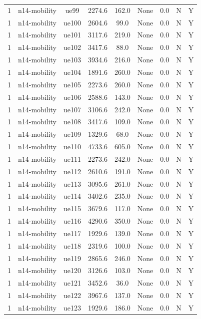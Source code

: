 \begin{table}[ht]
\begin{tabular}{|c|c|c|c|c|c|c|c|c|}
1 & n14-mobility & ue99 & 2274.6 & 162.0 & None & 0.0 & N & Y \\
1 & n14-mobility & ue100 & 2604.6 & 99.0 & None & 0.0 & N & Y \\
1 & n14-mobility & ue101 & 3117.6 & 219.0 & None & 0.0 & N & Y \\
1 & n14-mobility & ue102 & 3417.6 & 88.0 & None & 0.0 & N & Y \\
1 & n14-mobility & ue103 & 3934.6 & 216.0 & None & 0.0 & N & Y \\
1 & n14-mobility & ue104 & 1891.6 & 260.0 & None & 0.0 & N & Y \\
1 & n14-mobility & ue105 & 2273.6 & 260.0 & None & 0.0 & N & Y \\
1 & n14-mobility & ue106 & 2588.6 & 143.0 & None & 0.0 & N & Y \\
1 & n14-mobility & ue107 & 3106.6 & 242.0 & None & 0.0 & N & Y \\
1 & n14-mobility & ue108 & 3417.6 & 109.0 & None & 0.0 & N & Y \\
1 & n14-mobility & ue109 & 1329.6 & 68.0 & None & 0.0 & N & Y \\
1 & n14-mobility & ue110 & 4733.6 & 605.0 & None & 0.0 & N & Y \\
1 & n14-mobility & ue111 & 2273.6 & 242.0 & None & 0.0 & N & Y \\
1 & n14-mobility & ue112 & 2610.6 & 191.0 & None & 0.0 & N & Y \\
1 & n14-mobility & ue113 & 3095.6 & 261.0 & None & 0.0 & N & Y \\
1 & n14-mobility & ue114 & 3402.6 & 235.0 & None & 0.0 & N & Y \\
1 & n14-mobility & ue115 & 3679.6 & 117.0 & None & 0.0 & N & Y \\
1 & n14-mobility & ue116 & 4290.6 & 350.0 & None & 0.0 & N & Y \\
1 & n14-mobility & ue117 & 1929.6 & 139.0 & None & 0.0 & N & Y \\
1 & n14-mobility & ue118 & 2319.6 & 100.0 & None & 0.0 & N & Y \\
1 & n14-mobility & ue119 & 2865.6 & 246.0 & None & 0.0 & N & Y \\
1 & n14-mobility & ue120 & 3126.6 & 103.0 & None & 0.0 & N & Y \\
1 & n14-mobility & ue121 & 3452.6 & 36.0 & None & 0.0 & N & Y \\
1 & n14-mobility & ue122 & 3967.6 & 137.0 & None & 0.0 & N & Y \\
1 & n14-mobility & ue123 & 1929.6 & 186.0 & None & 0.0 & N & Y \\

\end{tabular}
\end{table}
